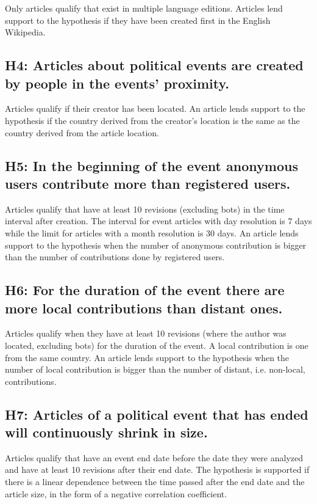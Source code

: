Only articles qualify that exist in multiple language editions.
Articles lend support to the hypothesis if they have been created first in the English Wikipedia.

\subsection*{H4: Articles about political events are created by people in the events' proximity.}

Articles qualify if their creator has been located.
An article lends support to the hypothesis if the country derived from the creator's location is the same as the country derived from the article location.

\subsection*{H5: In the beginning of the event anonymous users contribute more than registered users.}

Articles qualify that have at least 10 revisions (excluding bots) in the time interval after creation.
The interval for event articles with day resolution is 7 days while the limit for articles with a month resolution is 30 days.
An article lends support to the hypothesis when the number of anonymous contribution is bigger than the number of contributions done by registered users.

\subsection*{H6: For the duration of the event there are more local contributions than distant ones.}

Articles qualify when they have at least 10 revisions (where the author was located, excluding bots) for the duration of the event.
A local contribution is one from the same country. 
An article lends support to the hypothesis when the number of local contribution is bigger than the number of distant, i.e. non-local, contributions.

\subsection*{H7: Articles of a political event that has ended will continuously shrink in size.}

Articles qualify that have an event end date before the date they were analyzed and have at least 10 revisions after their end date.
The hypothesis is supported if there is a linear dependence between the time passed after the end date and the article size, in the form of a negative correlation coefficient.


